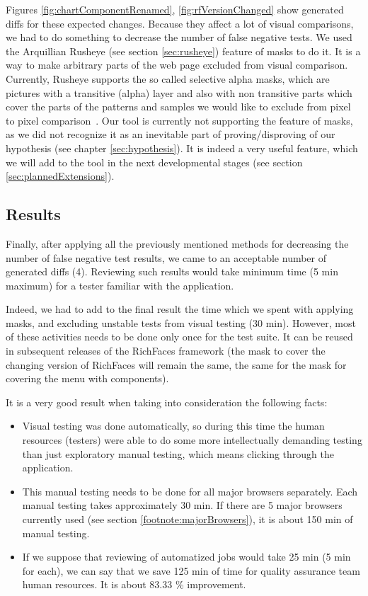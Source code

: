 \documentclass[11pt,oneside,final]{fithesis2}
\begin{document}
  Figures \ref{fig:chartComponentRenamed}, \ref{fig:rfVersionChanged} show generated diffs for these expected changes. Because they
  affect a lot of visual comparisons, we had to do something to decrease the number of false negative tests. We used the Arquillian Rusheye 
  (see section \ref{sec:rusheye}) feature of masks to do it. It is a way to make arbitrary parts of the web page excluded from
  visual comparison. Currently, Rusheye supports the so called selective alpha masks, which are pictures with a transitive (alpha) layer
  and also with non transitive parts which cover the parts of the patterns and samples we would like to exclude from pixel to
  pixel comparison~\citep{lukas_bc_thesis}. Our tool is currently not supporting the feature of masks, as we did not recognize it as an inevitable part of
  proving/disproving of our hypothesis (see chapter \ref{sec:hypothesis}). It is indeed a very useful feature, which we will
  add to the tool in the next developmental stages (see section \ref{sec:plannedExtensions}).
  
  \subsection{Results}
  
  Finally, after applying all the previously mentioned methods for decreasing the number of false negative test results, we came to an acceptable
  number of generated diffs (4). Reviewing such results would take minimum time (5 min maximum) for a tester familiar with the application.
  
  Indeed, we had to add to the final result the time which we spent with applying masks, and excluding unstable tests from visual
  testing (30 min). However, most of these activities needs to be done only once for the test suite. It can be reused in subsequent
  releases of the RichFaces framework (the mask to cover the changing version of RichFaces will remain the same, the same for the mask for covering
  the menu with components).
  
  It is a very good result when taking into consideration the following facts:
  
  \begin{itemize}
   \item Visual testing was done automatically, so during this time the human resources (testers) were able to do some more 
   intellectually demanding testing than just exploratory manual testing, which means clicking through the application.
   \item This manual testing needs to be done for all major browsers separately. Each manual testing takes approximately 30 min.
         If there are 5 major browsers currently used (see section \ref{footnote:majorBrowsers}), it is about 150 min of manual testing.
   \item If we suppose that reviewing of automatized jobs would take 25 min (5 min for each), we can say that we save
	 125 min of time for quality assurance team human resources. It is about 83.33 \% improvement.
  \end{itemize}
\end{document}
